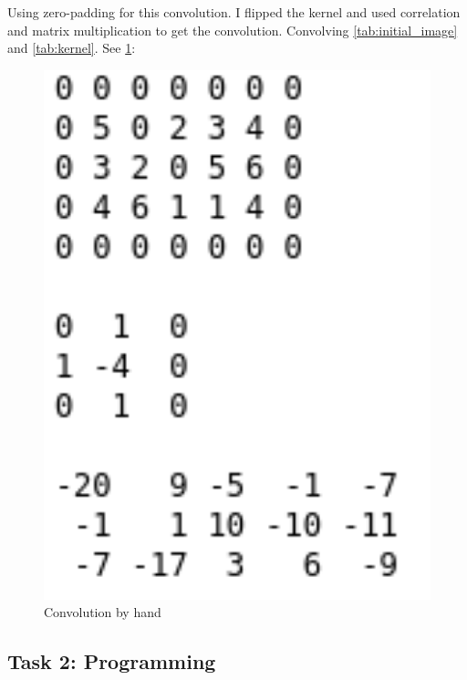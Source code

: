 Using zero-padding for this convolution. I flipped the kernel and used correlation and matrix multiplication to get the convolution. Convolving \cref{tab:initial_image} and \cref{tab:kernel}. See \cref{fig:kernel_convolution}: 
\begin{figure}[]
    \centering
    \includegraphics[width=1.00\textwidth]{figures/convolution_by_hand.png}
    \caption{Convolution by hand}
    \label{fig:kernel_convolution}
\end{figure}


\newpage
\subsection{Task 2: Programming}
